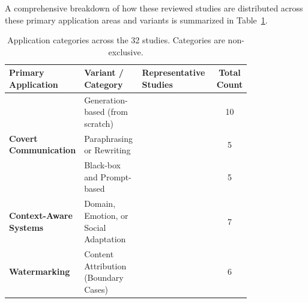 A comprehensive breakdown of how these reviewed studies are distributed across these primary application areas and variants is summarized in Table~\ref{tab:app_distribution}.

\begin{table}[t]
	\centering
	\small
	\caption{Application categories across the 32 studies. Categories are non-exclusive.}
	\label{tab:app_distribution}
	\begin{tabular}{|p{0.2\linewidth}|p{0.25\linewidth}|p{0.35\linewidth}|c|}
		\hline
		\textbf{Primary Application}                   & \textbf{Variant / Category}           & \textbf{Representative Studies}                                                                                                                                                 & \textbf{Total Count} \\
		\hline
		\multirow{3}{*}{\textbf{Covert Communication}} & Generation-based (from scratch)       & \cite{yang2020vae,kaptchuk2021meteor,ding2023discop,li2023rewriting,ding2023context,wu2024generative,lin2024zero,wang2025contrastive,kuznetsov2025deepstego,shi2025emotionally} & 10                   \\
		\cline{2-4}
		                                               & Paraphrasing or Rewriting             & \cite{chen2025cdea,wozniak2025multicriteria,lin2025positionagnostic,ou2025multigranularity,chen2025activetwo}                                                                   & 5                    \\
		\cline{2-4}
		                                               & Black-box and Prompt-based            & \cite{ji2024principled,yi2022alisa,li2024semantic,xu2024beyond,xiang2023cpg}                                                                                                    & 5                    \\
		\hline
		\textbf{Context-Aware Systems}                 & Domain, Emotion, or Social Adaptation & \cite{liao2024co,zhang2024controllable,munyer2024deeptextmark,pang2024fremax,zheng2022general,wang2023hi,li2024imperceptible}                                                   & 7                    \\
		\hline
		\textbf{Watermarking}                          & Content Attribution (Boundary Cases)  & \cite{ding2023joint,zhang2020linguistic,steinebach2024natural,qiang2023natural,qi2024provably,math9212829}                                                                      & 6                    \\
		\hline
	\end{tabular}
\end{table}


